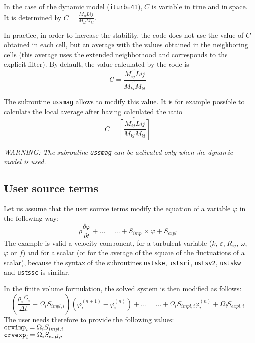 {{{In the case of the dynamic model (\texttt{iturb=41}), $C$ is variable in
time and in space. It is determined by
$\displaystyle C=\frac{M_{ij}L{ij}}{M_{kl}M_{kl}}$.

In practice, in order to increase the stability, the code does not use the
value of $C$ obtained in each cell, but an average with the values
obtained in the neighboring cells (this average uses the extended
neighborhood and corresponds to the explicit filter). By default, the
value calculated by the code is
\begin{displaymath}
C=\frac{\widetilde{M_{ij}L{ij}}}{\widetilde{M_{kl}M_{kl}}}
\end{displaymath}

The subroutine \texttt{ussmag} allows to modify this value. It is for
example possible to calculate the local average after having calculated the
ratio
\begin{displaymath}
C=\widetilde{\left[\frac{M_{ij}L{ij}}{M_{kl}M_{kl}}\right]}
\end{displaymath}

{\em WARNING: The subroutine {\em\texttt{ussmag}} can be activated only when
the dynamic model is used.}

\subsection{User source terms}

Let us assume that the user source terms modify the equation of a
variable $\varphi$ in the following way:
\begin{displaymath}
\rho\frac{\partial \varphi}{\partial t}+\ldots = \ldots + S_{impl}\times\varphi+S_{expl}
\end{displaymath}
The example is valid a velocity component, for a turbulent variable ($k$, $\varepsilon$, $R_{ij}$, $\omega$,
$\varphi$ or $\overline{f}$) and for a scalar (or for the average of the
square of the fluctuations of a scalar), because the syntax of the
subroutines \texttt{ustske}, \texttt{ustsri}, \texttt{ustsv2},
\texttt{ustskw} and \texttt{ustssc} is similar.

In the finite volume formulation, the solved system is then modified as
follows:
\begin{displaymath}
\left(\frac{\rho_i\Omega_i}{\Delta t_i}-\Omega_iS_{impl,i}\right)
\left(\varphi_i^{(n+1)}-\varphi_i^{(n)}\right)
+\ldots = \ldots + \Omega_iS_{impl,i}\varphi_i^{(n)} + \Omega_iS_{expl,i}
\end{displaymath}
The user needs therefore to provide the following values:\\
$\text{\texttt{crvimp}}_i=\Omega_iS_{impl,i}$\\
$\text{\texttt{crvexp}}_i=\Omega_iS_{expl,i}$

}}}
